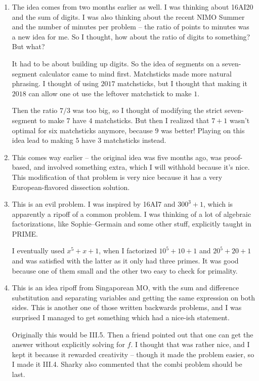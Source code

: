 \documentclass[10pt,paper=letter]{scrartcl}
\begin{document}
\begin{enumerate}
  \item The idea comes from two months earlier as well. I was thinking about 16AI20 and the sum of digits. I was also thinking about the recent NIMO Summer and the number of minutes per problem -- the ratio of points to minutes was a new idea for me. So I thought, how about the ratio of digits to something? But what?

  It had to be about building up digits. So the idea of segments on a seven-segment calculator came to mind first. Matchsticks made more natural phrasing. I thought of using $2017$ matchsticks, but I thought that making it $2018$ can allow one ot use the leftover matchstick to make $1$.

  Then the ratio $7/3$ was too big, so I thought of modifying the strict seven-segment to make $7$ have $4$ matchsticks. But then I realized that $7+1$ wasn't optimal for six matchsticks anymore, because $9$ was better! Playing on this idea lead to making $5$ have $3$ matchsticks instead.

  \item This comes way earlier -- the original idea was five months ago, was proof-based, and involved something extra, which I will withhold because it's nice. This modification of that problem is very nice because it has a very European-flavored dissection solution. 

  \item This is an evil problem. I was inspired by 16AI7 and $300^3 + 1$, which is apparently a ripoff of a common problem. I was thinking of a lot of algebraic factorizations, like Sophie--Germain and some other stuff, explicitly taught in PRIME.

  I eventually used $x^5 + x + 1$, when I factorized $10^5 + 10 + 1$ and $20^5 + 20 + 1$ and was satisfied with the latter as it only had three primes. It was good because one of them small and the other two easy to check for primality.

  \item This is an idea ripoff from Singaporean MO, with the sum and difference substitution and separating variables and getting the same expression on both sides. This is another one of those written backwards problems, and I was surprised I managed to get something which had a nice-ish statement. 

  Originally this would be III.5. Then a friend pointed out that one can get the answer without explicitly solving for $f$. I thought that was rather nice, and I kept it because it rewarded creativity -- though it made the problem easier, so I made it III.4. Sharky also commented that the combi problem should be last.


\end{enumerate}
\end{document}
